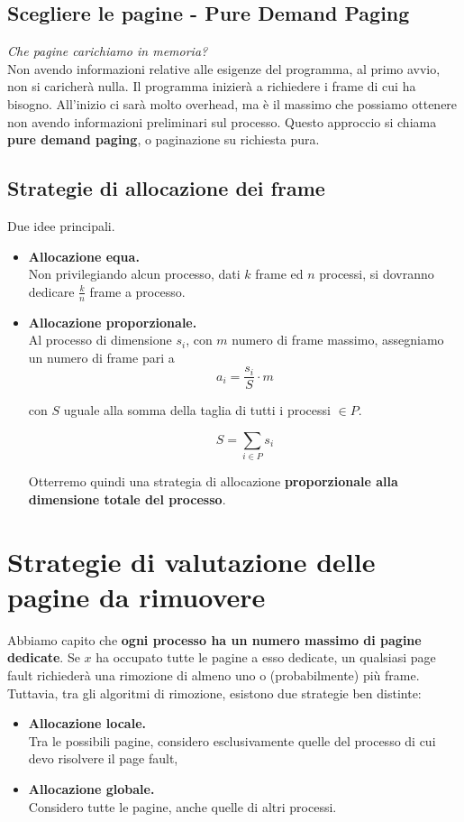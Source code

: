 \documentclass{report}
\begin{document}
\subsection{Scegliere le pagine - Pure Demand Paging}
\textit{Che pagine carichiamo in memoria?}\\
Non avendo informazioni relative alle esigenze del programma, al primo avvio, non si caricherà nulla. Il programma inizierà a richiedere i frame di cui ha bisogno. All'inizio ci sarà molto overhead, ma è il massimo che possiamo ottenere non avendo informazioni preliminari sul processo. Questo approccio si chiama \textbf{pure demand paging}, o paginazione su richiesta pura.

\subsection{Strategie di allocazione dei frame}
Due idee principali.
\begin{itemize}
    \item \textbf{Allocazione equa.}\\
    Non privilegiando alcun processo, dati $k$ frame ed $n$ processi, si dovranno dedicare $\frac{k}{n}$ frame a processo.
    \item \textbf{Allocazione proporzionale.}\\
    Al processo di dimensione $s_i$, con $m$ numero di frame massimo, assegniamo un numero di frame pari a
    $$
    a_i = \frac{s_i}{S}\cdot m
    $$
    
    con $S$ uguale alla somma della taglia di tutti i processi $\in P$.
    
    $$ 
    S=\sum_{i\in P} s_i
    $$
    
    Otterremo quindi una strategia di allocazione \textbf{proporzionale alla dimensione totale del processo}.
\end{itemize}

\newpage

\section{Strategie di valutazione delle pagine da rimuovere}
Abbiamo capito che \textbf{ogni processo ha un numero massimo di pagine dedicate}. Se $x$ ha occupato tutte le pagine a esso dedicate, un qualsiasi page fault richiederà una rimozione di almeno uno o (probabilmente) più frame.
Tuttavia, tra gli algoritmi di rimozione, esistono due strategie ben distinte:
\begin{itemize}
    \item \textbf{Allocazione locale.}\\
    Tra le possibili pagine, considero esclusivamente quelle del processo di cui devo risolvere il page fault,
    \item \textbf{Allocazione globale.}\\
    Considero tutte le pagine, anche quelle di altri processi.
\end{itemize}
\end{document}
